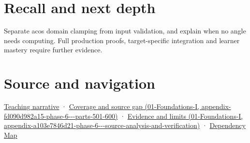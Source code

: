 \section{Recall and next depth}\label{appendix-e569e60e18e6-recall-and-next-depth}

Separate acos domain clamping from input validation, and explain when no angle needs computing. Full production proofs, target-specific integration and learner mastery require further evidence.

\section{Source and navigation}\label{appendix-e569e60e18e6-source-and-navigation}

\href{Continuous\%20Notes/Computing\%20Foundations\%20-\%20From\%20Bits\%20to\%20C++\%20and\%20Systems\%20APIs\#An\%20angle\%20is\%20a\%20question\%20with\%20a\%20domain}{Teaching narrative} · \href{../01-Foundations-I/main.pdf\#nameddest=appendix-fd090d982a15-phase-6---parts-501-600}{Coverage and source gap (01-Foundations-I, appendix-fd090d982a15-phase-6-\/-\/-parts-501-600)} · \href{../01-Foundations-I/main.pdf\#nameddest=appendix-a103e7846d21-phase-6---source-analysis-and-verification}{Evidence and limits (01-Foundations-I, appendix-a103e7846d21-phase-6-\/-\/-source-analysis-and-verification)} · \hyperref[appendix-4ad47bdd269a]{Dependency Map}

